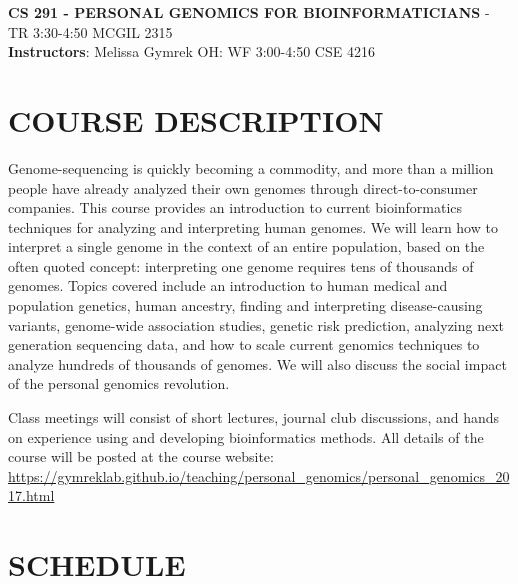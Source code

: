 \documentclass[12pt]{article}
\begin{document}
\textbf{CS 291 - PERSONAL GENOMICS FOR BIOINFORMATICIANS} - TR 3:30-4:50 MCGIL 2315 \\
\textbf{Instructors}: Melissa Gymrek OH: WF 3:00-4:50 CSE 4216 \\

\section*{COURSE DESCRIPTION}
Genome-sequencing is quickly becoming a commodity, and more than a million people have already analyzed their own genomes through direct-to-consumer companies. This course provides an introduction to current bioinformatics techniques for analyzing and interpreting human genomes. We will learn how to interpret a single genome in the context of an entire population, based on the often quoted concept: interpreting one genome requires tens of thousands of genomes. Topics covered include an introduction to human medical and population genetics, human ancestry, finding and interpreting disease-causing variants, genome-wide association studies, genetic risk prediction, analyzing next generation sequencing data, and how to scale current genomics techniques to analyze hundreds of thousands of genomes. We will also discuss the social impact of the personal genomics revolution.

Class meetings will consist of short lectures, journal club discussions, and hands on experience using and developing bioinformatics methods. All details of the course will be posted at the course website:\\
\href{https://gymreklab.github.io/teaching/personal\_genomics/personal\_genomics_2017.html}{https://gymreklab.github.io/teaching/personal\_genomics/personal\_genomics\_2017.html}




\section*{SCHEDULE}
\end{document}
